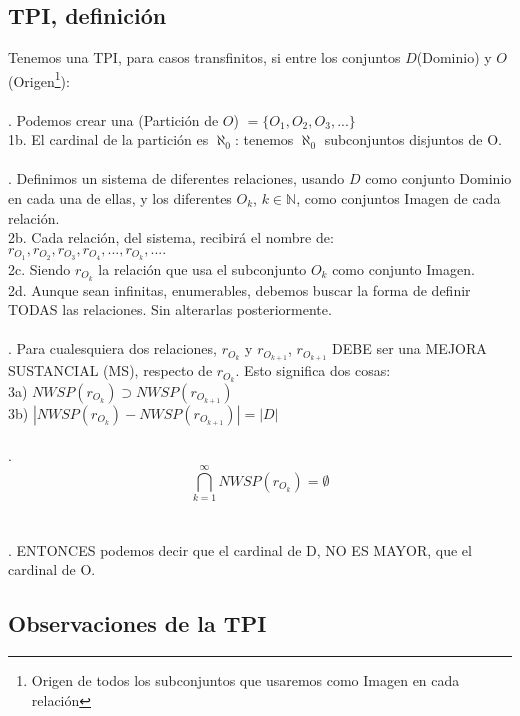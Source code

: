 	\subsection{TPI, definición}
	\noindent
	Tenemos una TPI, para casos transfinitos, si entre los conjuntos $D$(Dominio) y $O$(Origen\footnote{Origen de todos los subconjuntos que usaremos como Imagen en cada relación}):
	\\\\
	
	. Podemos crear una (Partición de $O$) $= \{O_{1}, O_{2}, O_{3}, ...\}$\\
	1b. El cardinal de la partición es $\aleph_{0}$: tenemos $\aleph_{0}$ subconjuntos disjuntos de O.
	\\\\
	
	. Definimos un sistema de diferentes relaciones, usando $D$ como conjunto Dominio en cada una de ellas, y los diferentes $O_{k}$, $k \in \mathbb{N}$, como conjuntos Imagen de cada relación.\\
	2b. Cada relación, del sistema, recibirá el nombre de:\\
	$r_{O_{1}}, r_{O_{2}}, r_{O_{3}}, r_{O_{4}}, ..., r_{O_{k}}, ....$\\
	2c. Siendo $r_{O_{k}}$ la relación que usa el subconjunto $O_{k}$ como conjunto Imagen.\\
	2d. Aunque sean infinitas, enumerables, debemos buscar la forma de definir TODAS las relaciones. Sin alterarlas posteriormente.
	\\\\
	
	. Para cualesquiera dos relaciones, $r_{O_{k}}$ y $r_{O_{k+1}}$, $r_{O_{k+1}}$ DEBE ser una MEJORA SUSTANCIAL (MS), respecto de $r_{O_{k}}$. Esto significa dos cosas:\\
	3a) $NWSP(r_{O_{k}}) \supset NWSP(r_{O_{k+1}})$\\
	3b) $  |NWSP(r_{O_{k}}) - NWSP(r_{O_{k+1}}) | = |D| $
	\\\\
	
	. $$ \bigcap_{k=1}^{\infty} NWSP(r_{O_{k}}) = \emptyset $$
	\\\\
	
	. ENTONCES podemos decir que el cardinal de D, NO ES MAYOR, que el cardinal de O.
	
	\subsection{Observaciones de la TPI}
	
